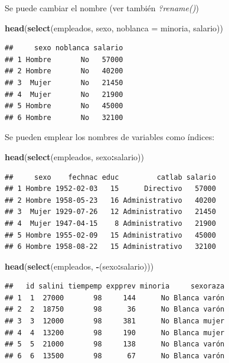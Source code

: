 \documentclass[]{book}
\newenvironment{Shaded}{\begin{snugshade}}{\end{snugshade}}
\newcommand{\KeywordTok}[1]{\textcolor[rgb]{0.13,0.29,0.53}{\textbf{#1}}}
\newcommand{\DataTypeTok}[1]{\textcolor[rgb]{0.13,0.29,0.53}{#1}}
\newcommand{\OperatorTok}[1]{\textcolor[rgb]{0.81,0.36,0.00}{\textbf{#1}}}
\newcommand{\NormalTok}[1]{#1}
\begin{document}
Se puede cambiar el nombre (ver también \emph{?rename()})

\begin{Shaded}
\begin{Highlighting}[]
\KeywordTok{head}\NormalTok{(}\KeywordTok{select}\NormalTok{(empleados, sexo, }\DataTypeTok{noblanca =}\NormalTok{ minoria, salario))}
\end{Highlighting}
\end{Shaded}

\begin{verbatim}
##     sexo noblanca salario
## 1 Hombre       No   57000
## 2 Hombre       No   40200
## 3  Mujer       No   21450
## 4  Mujer       No   21900
## 5 Hombre       No   45000
## 6 Hombre       No   32100
\end{verbatim}

Se pueden emplear los nombres de variables como índices:

\begin{Shaded}
\begin{Highlighting}[]
\KeywordTok{head}\NormalTok{(}\KeywordTok{select}\NormalTok{(empleados, sexo}\OperatorTok{:}\NormalTok{salario))}
\end{Highlighting}
\end{Shaded}

\begin{verbatim}
##     sexo    fechnac educ         catlab salario
## 1 Hombre 1952-02-03   15      Directivo   57000
## 2 Hombre 1958-05-23   16 Administrativo   40200
## 3  Mujer 1929-07-26   12 Administrativo   21450
## 4  Mujer 1947-04-15    8 Administrativo   21900
## 5 Hombre 1955-02-09   15 Administrativo   45000
## 6 Hombre 1958-08-22   15 Administrativo   32100
\end{verbatim}

\begin{Shaded}
\begin{Highlighting}[]
\KeywordTok{head}\NormalTok{(}\KeywordTok{select}\NormalTok{(empleados, }\OperatorTok{-}\NormalTok{(sexo}\OperatorTok{:}\NormalTok{salario)))}
\end{Highlighting}
\end{Shaded}

\begin{verbatim}
##   id salini tiempemp expprev minoria     sexoraza
## 1  1  27000       98     144      No Blanca varón
## 2  2  18750       98      36      No Blanca varón
## 3  3  12000       98     381      No Blanca mujer
## 4  4  13200       98     190      No Blanca mujer
## 5  5  21000       98     138      No Blanca varón
## 6  6  13500       98      67      No Blanca varón
\end{verbatim}
\end{document}

